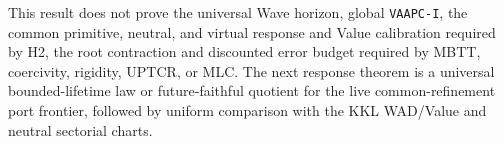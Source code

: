 \documentclass[11pt]{article}
\theoremstyle{definition}
\theoremstyle{remark}
\begin{document}
This result does not prove the universal Wave horizon, global \texttt{VAAPC-I},
the common primitive, neutral, and virtual response and Value calibration
required by H2, the root contraction and discounted error budget required by MBTT,
coercivity, rigidity, UPTCR, or MLC.  The next response theorem is a universal
bounded-lifetime law or future-faithful quotient for the live common-refinement
port frontier, followed by uniform comparison with the KKL WAD/Value and neutral
sectorial charts.
\end{document}
